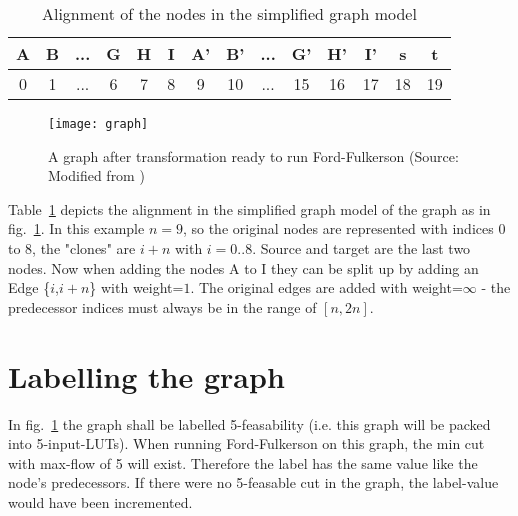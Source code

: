 \begin{table}[]
	\centering
	\begin{tabular}{|cccccc|cccccc|cc|}
		\hline
	A & B & ... & G & H & I & A' & B' & ... & G'  & H'  & I'  & s  & t  \\
		\hline
	0 & 1 &  ... & 6 & 7 & 8 & 9  & 10 & ... & 15 & 16 & 17 & 18 & 19 \\
		\hline
	\end{tabular}
	\caption{Alignment of the nodes in the simplified graph model}
	\label{tbl:simple-graph-model}
\end{table}
\begin{figure}
	\centering
	\texttt{[image: graph]}
	\caption{A graph after transformation ready to run Ford-Fulkerson (Source: Modified from \cite{Hochberger2017})}
	\label{fig:split-graph}
\end{figure}

Table~\ref{tbl:simple-graph-model} depicts the alignment in the simplified graph model of the graph as in fig.~\ref{fig:split-graph}. In this example $n=9$, so the original nodes are represented with indices $0$ to $8$, the "clones" are $i+n$ with $i=0..8$. Source and target are the last two nodes. Now when adding the nodes A to I they can be split up by adding an Edge \{$i$,$i+n$\} with weight=$1$. The original edges are added with weight=$\infty$ - the predecessor indices must always be in the range of $[n,2n]$.

\section{Labelling the graph}
In fig.~\ref{fig:split-graph} the graph shall be labelled 5-feasability (i.e. this graph will be packed into 5-input-LUTs). When running Ford-Fulkerson on this graph, the min cut with max-flow of 5 will exist. Therefore the label has the same value like the node's predecessors. If there were no 5-feasable cut in the graph, the label-value would have been incremented.

